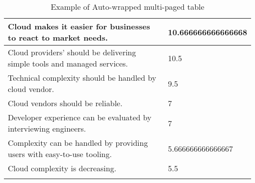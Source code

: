 \begin{longtable}{|p{10cm}|p{2cm}|}
Cloud makes it easier for businesses to react to market needs. & 10.666666666666668 \\ \hline
Cloud providers' should be delivering simple tools and managed services. & 10.5 \\ \hline
Technical complexity should be handled by cloud vendor. & 9.5 \\ \hline
Cloud vendors should be reliable. & 7 \\ \hline
Developer experience can be evaluated by interviewing engineers. & 7 \\ \hline
Complexity can be handled by providing users with easy-to-use tooling. & 5.666666666666667 \\ \hline
Cloud complexity is decreasing. & 5.5 \\ \hline
\caption{Example of Auto-wrapped multi-paged table}
\label{tab:table1}
\end{longtable}
